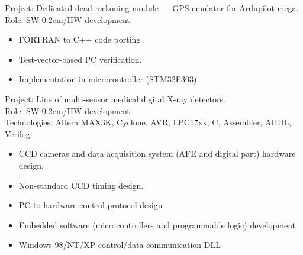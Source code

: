 \documentclass[11pt,a4paper]{moderncv}
\begin{document}
  {Project: Dedicated dead reckoning module — GPS emulator for Ardupilot mega.\\
    Role: SW\kern-0.2em/HW development
    \begin{itemize}
      \item FORTRAN to C++ code porting
      \item Test-vector-based PC verification.
      \item Implementation in microcontroller (STM32F303)
    \end{itemize}}

  {Project: Line of multi-sensor medical digital X-ray detectors.\\
    Role: SW\kern-0.2em/HW development\\
    Technologies: Altera MAX3K, Cyclone, AVR, LPC17xx; C, Assembler, AHDL, Verilog
    \begin{itemize}
      \item CCD cameras and data acquisition system (AFE and digital part) hardware design.
      \item Non-standard CCD timing design.
      \item PC to hardware control protocol design
      \item Embedded software (microcontrollers and programmable logic) development
      \item Windows 98/NT/XP control/data communication DLL
    \end{itemize}}
\end{document}
